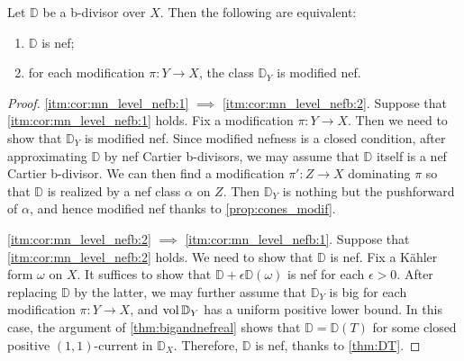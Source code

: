 \begin{corollary}\label{cor:mn_level_nefb}
    Let $\mathbb{D}$ be a b-divisor over $X$. Then the following are equivalent:
    \begin{enumerate}
        \item\label{itm:cor:mn_level_nefb:1} $\mathbb{D}$ is nef;
        \item\label{itm:cor:mn_level_nefb:2} for each modification $\pi\colon Y\rightarrow X$, the class $\mathbb{D}_Y$ is modified nef.
    \end{enumerate}
\end{corollary}
\begin{proof}
    \ref{itm:cor:mn_level_nefb:1} $\implies$ \ref{itm:cor:mn_level_nefb:2}. Suppose that \ref{itm:cor:mn_level_nefb:1} holds. Fix a modification $\pi\colon Y\rightarrow X$. Then we need to show that $\mathbb{D}_Y$ is modified nef. Since modified nefness is a closed condition, after approximating $\mathbb{D}$ by nef Cartier b-divisors, we may assume that $\mathbb{D}$ itself is a nef Cartier b-divisor. We can then find a modification $\pi'\colon Z\rightarrow X$ dominating $\pi$ so that $\mathbb{D}$ is realized by a nef class $\alpha$ on $Z$. Then $\mathbb{D}_Y$ is nothing but the pushforward of $\alpha$, and hence modified nef thanks to \cref{prop:cones_modif}.

    \ref{itm:cor:mn_level_nefb:2} $\implies$ \ref{itm:cor:mn_level_nefb:1}. Suppose that \ref{itm:cor:mn_level_nefb:2} holds. We need to show that $\mathbb{D}$ is nef. Fix a Kähler form $\omega$ on $X$. It suffices to show that $\mathbb{D}+\epsilon\mathbb{D}(\omega)$ is nef for each $\epsilon>0$. After replacing $\mathbb{D}$ by the latter, we may further assume that $\mathbb{D}_Y$ is big for each modification $\pi\colon Y\rightarrow X$, and $\operatorname{vol} \mathbb{D}_Y$ has a uniform positive lower bound.
    In this case, the argument of \cref{thm:bigandnefreal} shows that $\mathbb{D}=\mathbb{D}(T)$ for some closed positive $(1,1)$-current in $\mathbb{D}_X$. Therefore, $\mathbb{D}$ is nef, thanks to \cref{thm:DT}.
\end{proof}



